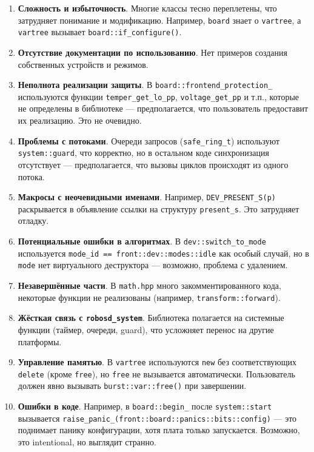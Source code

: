 \documentclass[a4paper,12pt]{article}
\begin{document}
\begin{enumerate}
    \item \textbf{Сложность и избыточность}. Многие классы тесно переплетены, что затрудняет понимание и модификацию. Например, \texttt{board} знает о \texttt{vartree}, а \texttt{vartree} вызывает \texttt{board::if\_configure()}.
    \item \textbf{Отсутствие документации по использованию}. Нет примеров создания собственных устройств и режимов.
    \item \textbf{Неполнота реализации защиты}. В \texttt{board::frontend\_protection\_} используются функции \texttt{temper\_get\_lo\_pp}, \texttt{voltage\_get\_pp} и т.п., которые не определены в библиотеке — предполагается, что пользователь предоставит их реализацию. Это не очевидно.
    \item \textbf{Проблемы с потоками}. Очереди запросов (\texttt{safe\_ring\_t}) используют \texttt{system::guard}, что корректно, но в остальном коде синхронизация отсутствует — предполагается, что вызовы циклов происходят из одного потока.
    \item \textbf{Макросы с неочевидными именами}. Например, \texttt{DEV\_PRESENT\_S(p)} раскрывается в объявление ссылки на структуру \texttt{present\_s}. Это затрудняет отладку.
    \item \textbf{Потенциальные ошибки в алгоритмах}. В \texttt{dev::switch\_to\_mode} используется \texttt{mode\_id == front::dev::modes::idle} как особый случай, но в \texttt{mode} нет виртуального деструктора — возможно, проблема с удалением.
    \item \textbf{Незавершённые части}. В \texttt{math.hpp} много закомментированного кода, некоторые функции не реализованы (например, \texttt{transform::forward}).
    \item \textbf{Жёсткая связь с \texttt{robosd\_system}}. Библиотека полагается на системные функции (таймер, очереди, guard), что усложняет перенос на другие платформы.
    \item \textbf{Управление памятью}. В \texttt{vartree} используются \texttt{new} без соответствующих \texttt{delete} (кроме \texttt{free}), но \texttt{free} не вызывается автоматически. Пользователь должен явно вызывать \texttt{burst::var::free()} при завершении.
    \item \textbf{Ошибки в коде}. Например, в \texttt{board::begin\_} после \texttt{system::start} вызывается \texttt{raise\_panic\_(front::board::panics::bits::config)} — это поднимает панику конфигурации, хотя плата только запускается. Возможно, это intentional, но выглядит странно.
\end{enumerate}
\end{document}
